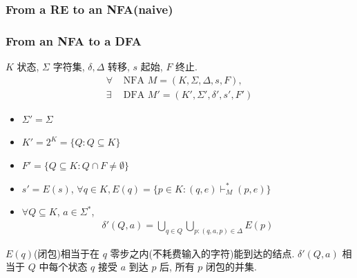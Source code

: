 \subsubsection{From a RE to an NFA(naive)}

\subsubsection{From an NFA to a DFA}
$K$ 状态, $\Sigma$ 字符集, $\delta, \Delta$ 转移, $s$ 起始, $F$ 终止. 
\begin{align*}
    \forall&\text{ NFA }M=(K,\Sigma, \Delta, s, F), \\
    \exists&\text{ DFA }M'=(K',\Sigma', \delta', s', F')
\end{align*}
\begin{itemize}
    \item $\Sigma'=\Sigma$
    \item $K'=2^K=\{ Q:Q\subseteq K \}$
    \item $F'=\{ Q\subseteq K:Q\cap F\ne \emptyset \}$
    \item $s'=E(s)$, 
    \subitem $\forall q\in K, E(q)=\{ p\in K:(q,e)\vdash_M^* (p,e) \}$
    \item $\forall Q\subseteq K$, $a\in \Sigma^*$,
    \begin{align*}
        \delta'(Q,a)=\bigcup_{q\in Q}\bigcup_{p:(q,a,p)\in\Delta}E(p)
    \end{align*}
\end{itemize}
$E(q)$(闭包)相当于在 $q$ 零步之内(不耗费输入的字符)能到达的结点.  $\delta'(Q,a)$ 相当于 $Q$ 中每个状态 $q$ 接受 $a$ 到达 $p$ 后, 所有 $p$ 闭包的并集. 







